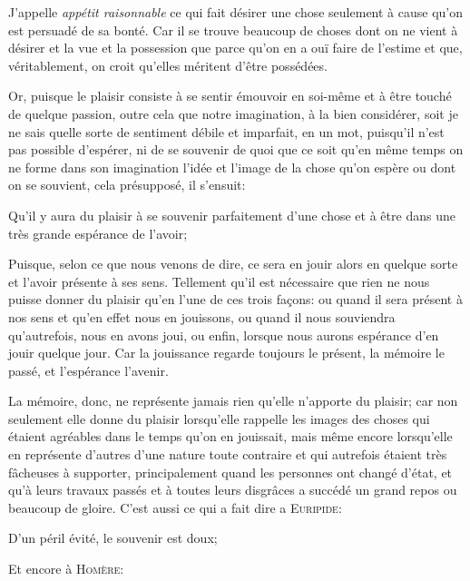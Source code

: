 J'appelle \emph{appétit raisonnable} ce qui fait désirer une chose seulement à cause qu'on est persuadé de sa bonté.
Car il se trouve beaucoup de choses dont on ne vient à désirer et la vue et la possession que parce qu'on en a ouï
faire de l'estime et que, véritablement, on croit qu'elles méritent d'être possédées. 

\bigbreak

Or, puisque le plaisir consiste à se sentir émouvoir en soi-même et à être touché de quelque passion, outre cela
que notre imagination, à la bien considérer, soit je ne sais quelle sorte de sentiment débile et imparfait, en un
mot, puisqu'il n'est pas possible d'espérer, ni de se souvenir de quoi que ce soit qu'en même temps on ne forme
dans son imagination l'idée et l'image de la chose qu'on espère ou dont on se souvient, cela présupposé, il
s'ensuit:

\begin{lieu}
	Qu'il y aura du plaisir à se souvenir parfaitement d'une chose et à être dans une très grande espérance de
	l'avoir;
\end{lieu}

Puisque, selon ce que nous venons de dire, ce sera en jouir alors en quelque sorte et l'avoir présente à ses
sens. Tellement qu'il est nécessaire que rien ne nous puisse donner du plaisir qu'en l'une de ces trois façons:
ou quand il sera présent à nos sens et qu'en effet nous en jouissons, ou quand il nous souviendra qu'autrefois,
nous en avons joui, ou enfin, lorsque nous aurons espérance d'en jouir quelque jour. Car la jouissance regarde
toujours le présent, la mémoire le passé, et l'espérance l'avenir.

\bigbreak

La mémoire, donc, ne représente jamais rien qu'elle n'apporte du plaisir; car non seulement elle donne du plaisir
lorsqu'elle rappelle les images des choses qui étaient agréables dans le temps qu'on en jouissait, mais même encore
lorsqu'elle en représente d'autres d'une nature toute contraire et qui autrefois étaient très fâcheuses à supporter,
principalement quand les personnes ont changé d'état, et qu'à leurs travaux passés et à toutes leurs disgrâces a
succédé un grand repos ou beaucoup de gloire. C'est aussi ce qui a fait dire a \textsc{Euripide}:

\begin{emphpar}
	D'un péril évité, le souvenir est doux;
\end{emphpar}

Et encore à \textsc{Homère}:

